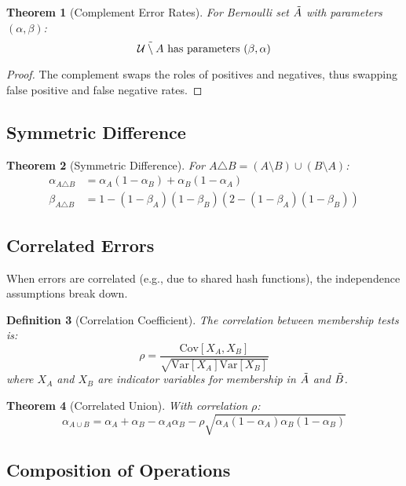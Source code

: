 \documentclass[11pt]{article}
\newtheorem{theorem}{Theorem}[section]
\newtheorem{definition}[theorem]{Definition}
\begin{document}
\begin{theorem}[Complement Error Rates]
For Bernoulli set $\tilde{A}$ with parameters $(\alpha, \beta)$:
\[
\tilde{\mathcal{U} \setminus A} \text{ has parameters } (\beta, \alpha)
\]
\end{theorem}

\begin{proof}
The complement swaps the roles of positives and negatives, thus swapping false positive and false negative rates.
\end{proof}

\subsection{Symmetric Difference}

\begin{theorem}[Symmetric Difference]
For $A \triangle B = (A \setminus B) \cup (B \setminus A)$:
\begin{align}
\alpha_{A \triangle B} &= \alpha_A(1-\alpha_B) + \alpha_B(1-\alpha_A) \\
\beta_{A \triangle B} &= 1 - (1-\beta_A)(1-\beta_B)(2 - (1-\beta_A)(1-\beta_B))
\end{align}
\end{theorem}

\subsection{Correlated Errors}

When errors are correlated (e.g., due to shared hash functions), the independence assumptions break down.

\begin{definition}[Correlation Coefficient]
The correlation between membership tests is:
\[
\rho = \frac{\text{Cov}[X_A, X_B]}{\sqrt{\text{Var}[X_A]\text{Var}[X_B]}}
\]
where $X_A$ and $X_B$ are indicator variables for membership in $\tilde{A}$ and $\tilde{B}$.
\end{definition}

\begin{theorem}[Correlated Union]
With correlation $\rho$:
\[
\alpha_{A \cup B} = \alpha_A + \alpha_B - \alpha_A\alpha_B - \rho\sqrt{\alpha_A(1-\alpha_A)\alpha_B(1-\alpha_B)}
\]
\end{theorem}

\subsection{Composition of Operations}
\end{document}
